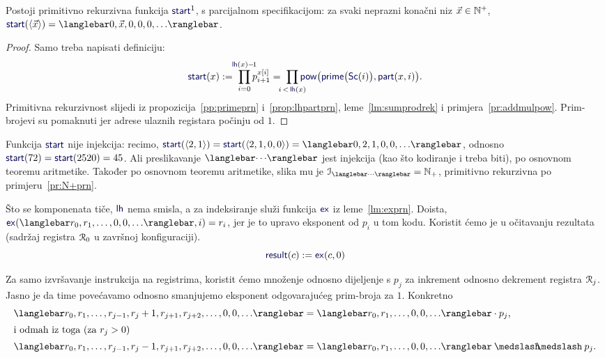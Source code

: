 \begin{lema}[{name=[primitivna rekurzivnost generatora početne konfiguracije]}]\label{lm:startprn}
    Postoji primitivno rekurzivna funkcija $\f{start}^1$\!, s parcijalnom specifikacijom: za svaki neprazni konačni niz $\vec x\in{\mathbb N}^+$\!, $\f{start}(\langle\vec x\rangle)=\knk{0,\vec x,0,0,0,\dotsc}$.
\end{lema}
\begin{proof}
Samo treba napisati definiciju:
\begin{equation}
    \f{start}(x):=\;\prod_{i=0}^{\mathclap{\f{lh}(x)-\!1}}p_{i+1}^{x[i]}=\;\prod_{\mathclap{i\,<\,\f{lh}(x)}}\f{pow}\bigl(\f{prime}\bigl(\f{Sc}(i)\bigr),\f{part}(x,i)\bigr)\text.
\end{equation}
Primitivna rekurzivnost slijedi iz propozicija~\ref{pp:primeprn} i~\ref{prop:lhpartprn}, leme~\ref{lm:sumprodrek} i primjera~\ref{pr:addmulpow}. Prim-brojevi su pomaknuti jer adrese ulaznih registara počinju od $1$.
\end{proof}

Funkcija $\f{start}$ nije injekcija: recimo, $\f{start}(\langle2,1\rangle)=\f{start}(\langle2,1,0,0\rangle)=\knk{0,2,1,0,0,\dotsc}$, odnosno $\f{start}(72)=\f{start}(2520)=45$. Ali preslikavanje $\knk{\cdots}$ jest injekcija (kao što kodiranje i treba biti), po osnovnom teoremu aritmetike. Također po osnovnom teoremu aritmetike, slika mu je $\im{\knk{\cdots}}=\N_+$, primitivno rekurzivna po primjeru~\ref{pr:N+prn}.

Što se komponenata tiče, $\f{lh}$ nema smisla, a za indeksiranje služi funkcija $\f{ex}$ iz leme~\ref{lm:exprn}. Doista, $\f{ex}(\knk{r_0,r_1,\dotsc,0,0,\dotsc},i)=r_i$, jer je to upravo eksponent od $p_i$ u tom kodu. Koristit ćemo je u očitavanju rezultata (sadržaj registra $\mathcal R_{0}$ u završnoj konfiguraciji).
\begin{equation}\label{eq:resultdef}
    \f{result}(c):=\f{ex}(c,0)
\end{equation}

Za samo izvršavanje instrukcija na registrima, koristit ćemo množenje odnosno dijeljenje s $p_j$ za inkrement odnosno dekrement registra $\mathcal R_{j}$. Jasno je da time povećavamo odnosno smanjujemo eksponent odgovarajućeg prim-broja za $1$. Konkretno
\begin{align}
\label{eq:knkppj}\knk{r_0,r_1,\dotsc,r_{j-1},r_j+1,r_{j+1},r_{j+2},\dotsc,0,0,\dotsc}
&=
\knk{r_0,r_1,\dotsc,0,0,\dotsc}\cdot p_j\text,
    \\\intertext{i odmah iz toga (za $r_j>0$)}
\label{eq:knkkpj}\knk{r_0,r_1,\dotsc,r_{j-1},r_j-1,r_{j+1},r_{j+2},\dotsc,0,0,\dotsc}
&=
\knk{r_0,r_1,\dotsc,0,0,\dotsc}\div p_j\text.
\end{align}

